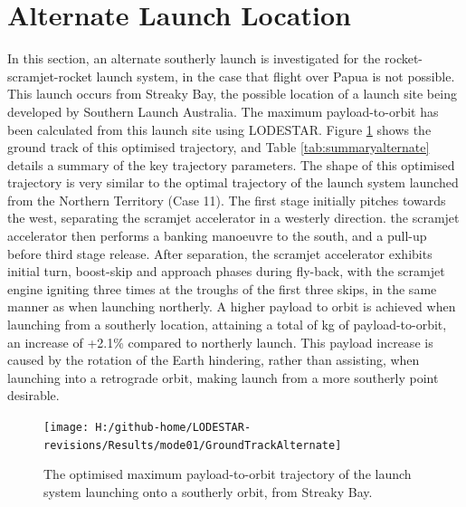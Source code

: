 \section{Alternate Launch Location}

In this section, an alternate southerly launch is investigated for the rocket-scramjet-rocket launch system, in the case that flight over Papua is not possible. This launch occurs from Streaky Bay, the possible location of a launch site being developed by Southern Launch Australia\cite{Council2016}. The maximum payload-to-orbit has been calculated from this launch site using LODESTAR. Figure \ref{fig:GroundTrackAlternate} shows the ground track of this optimised trajectory, and Table \ref{tab:summaryalternate} details a summary of the key trajectory parameters. The shape of this optimised trajectory is very similar to the optimal trajectory of the launch system launched from the Northern Territory (Case 11). The first stage initially pitches towards the west, separating the scramjet accelerator in a westerly direction. the scramjet accelerator then performs a banking manoeuvre to the south, and a pull-up before third stage release. After separation, the scramjet accelerator exhibits initial turn, boost-skip and approach phases during fly-back, with the scramjet engine igniting three times at the troughs of the first three skips, in the same manner as when launching northerly. A higher payload to orbit is achieved when launching from a southerly location, attaining a total of \PayloadToOrbitAlternate kg of payload-to-orbit, an increase of +2.1\% compared to northerly launch. This payload increase is caused by the rotation of the Earth hindering, rather than assisting, when launching into a retrograde orbit, making launch from a more southerly point desirable. 


\begin{figure}[th]
	\centering
	\texttt{[image: H:/github-home/LODESTAR-revisions/Results/mode01/GroundTrackAlternate]}
	\caption{The optimised maximum payload-to-orbit trajectory of the launch system launching onto a southerly orbit, from Streaky Bay.}
	\label{fig:GroundTrackAlternate}
\end{figure}

